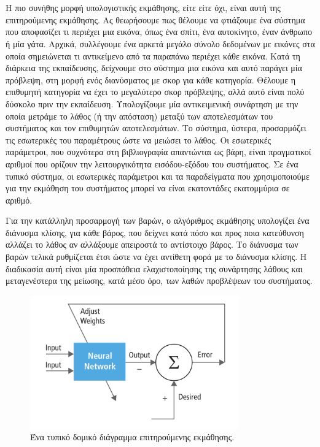 \section{\cite{LeCun2015}}

Η πιο συνήθης μορφή υπολογιστικής εκμάθησης, είτε  είτε όχι, είναι αυτή της επιτηρούμενης εκμάθησης.
Ας θεωρήσουμε πως θέλουμε να φτιάξουμε ένα σύστημα που αποφασίζει τι περιέχει μια εικόνα, όπως ένα σπίτι, ένα αυτοκίνητο, έναν άνθρωπο ή μία γάτα.
Αρχικά, συλλέγουμε ένα αρκετά μεγάλο σύνολο δεδομένων με εικόνες στα οποία σημειώνεται τι αντικείμενο από τα παραπάνω περιέχει κάθε εικόνα.
Κατά τη διάρκεια της εκπαίδευσης, δείχνουμε στο σύστημα μια εικόνα και αυτό παράγει μία πρόβλεψη, στη μορφή ενός διανύσματος με σκορ για κάθε κατηγορία.
Θέλουμε η επιθυμητή κατηγορία να έχει το μεγαλύτερο σκορ πρόβλεψης, αλλά αυτό είναι πολύ δύσκολο πριν την εκπαίδευση.
Υπολογίζουμε μία αντικειμενική συνάρτηση με την οποία μετράμε το λάθος (ή την απόσταση) μεταξύ των αποτελεσμάτων του συστήματος και τον επιθυμητών αποτελεσμάτων.
Το σύστημα, ύστερα, προσαρμόζει τις εσωτερικές του παραμέτρους ώστε να μειώσει το λάθος.
Οι εσωτερικές παράμετροι, που συχνότερα στη βιβλιογραφία απαντώνται ως βάρη, είναι πραγματικοί αριθμοί που ορίζουν την λειτουργικότητα εισόδου-εξόδου του συστήματος.
Σε ένα τυπικό  σύστημα, οι εσωτερικές παράμετροι και τα παραδείγματα που χρησιμοποιούμε για την εκμάθηση του συστήματος μπορεί να είναι εκατοντάδες εκατομμύρια σε αριθμό. 

Για την κατάλληλη προσαρμογή των βαρών, ο αλγόριθμος εκμάθησης υπολογίζει ένα διάνυσμα κλίσης, για κάθε βάρος, που δείχνει κατά πόσο και προς ποια κατεύθυνση αλλάζει το λάθος αν αλλάξουμε απειροστά το αντίστοιχο βάρος.
Το διάνυσμα των βαρών τελικά ρυθμίζεται έτσι ώστε να έχει αντίθετη φορά με το διάνυσμα κλίσης.
Η διαδικασία αυτή είναι μία προσπάθεια ελαχιστοποίησης της συνάρτησης λάθους και μεταγενέστερα της μείωσης, κατά μέσο όρο, των λαθών προβλέψεων του συστήματος.

\begin{figure}[tph]
	\includegraphics[width=0.8\textwidth, keepaspectratio]{images/training.png}
	\centering 
	\caption{Ένα τυπικό δομικό διάγραμμα επιτηρούμενης εκμάθησης.}
	\label{fig:training}
\end{figure}

